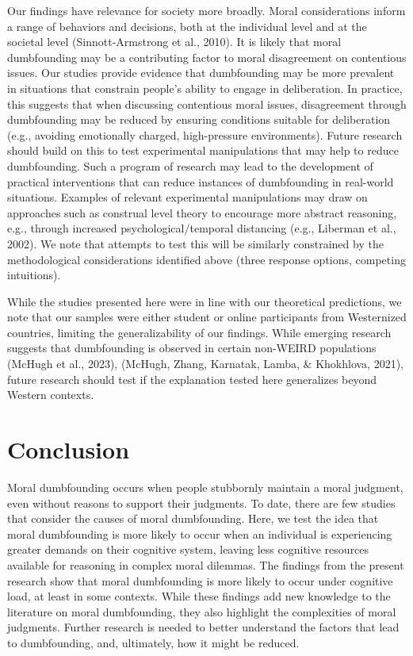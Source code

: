 \documentclass[
  man,floatsintext]{apa6}
\begin{document}
Our findings have relevance for society more broadly. Moral considerations inform a range of behaviors and decisions, both at the individual level and at the societal level (Sinnott-Armstrong et al., 2010). It is likely that moral dumbfounding may be a contributing factor to moral disagreement on contentious issues. Our studies provide evidence that dumbfounding may be more prevalent in situations that constrain people's ability to engage in deliberation. In practice, this suggests that when discussing contentious moral issues, disagreement through dumbfounding may be reduced by ensuring conditions suitable for deliberation (e.g., avoiding emotionally charged, high-pressure environments). Future research should build on this to test experimental manipulations that may help to reduce dumbfounding. Such a program of research may lead to the development of practical interventions that can reduce instances of dumbfounding in real-world situations. Examples of relevant experimental manipulations may draw on approaches such as construal level theory to encourage more abstract reasoning, e.g., through increased psychological/temporal distancing (e.g., Liberman et al., 2002). We note that attempts to test this will be similarly constrained by the methodological considerations identified above (three response options, competing intuitions).

While the studies presented here were in line with our theoretical predictions, we note that our samples were either student or online participants from Westernized countries, limiting the generalizability of our findings. While emerging research suggests that dumbfounding is observed in certain non-WEIRD populations (McHugh et al., 2023), (McHugh, Zhang, Karnatak, Lamba, \& Khokhlova, 2021), future research should test if the explanation tested here generalizes beyond Western contexts.

\hypertarget{conclusion}{%
\section{Conclusion}\label{conclusion}}

Moral dumbfounding occurs when people stubbornly maintain a moral judgment, even without reasons to support their judgments. To date, there are few studies that consider the causes of moral dumbfounding. Here, we test the idea that moral dumbfounding is more likely to occur when an individual is experiencing greater demands on their cognitive system, leaving less cognitive resources available for reasoning in complex moral dilemmas. The findings from the present research show that moral dumbfounding is more likely to occur under cognitive load, at least in some contexts. While these findings add new knowledge to the literature on moral dumbfounding, they also highlight the complexities of moral judgments. Further research is needed to better understand the factors that lead to dumbfounding, and, ultimately, how it might be reduced.
\end{document}
